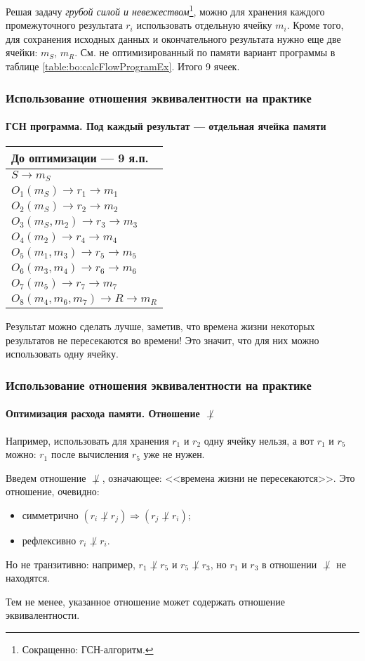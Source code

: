 Решая задачу \emph{грубой силой и невежеством}\footnote{Сокращенно: ГСН-алгоритм.}, можно для хранения каждого промежуточного результата $r_i$ использовать отдельную ячейку $m_i$. Кроме того, для сохранения исходных данных и окончательного результата нужно еще две ячейки: $m_S$, $m_R$. См. не оптимизированный по памяти вариант программы в таблице \ref{table:bo:calcFlowProgramEx}. Итого 9 ячеек.

\begin{frame}
    \frametitle{Использование отношения эквивалентности на практике}
    \framesubtitle{ГСН программа. Под каждый результат --- отдельная ячейка памяти}
    
    \begin{center}
        \begin{tabular}{l}
            \hline\hline
            До оптимизации --- 9 я.п.      \\
            \hline\hline
            $S \to m_S$                    \\ \hline
            $O_1(m_S)\to r_1 \to m_1$      \\
            $O_2(m_S)\to r_2 \to m_2$      \\ \hline
            $O_3(m_S,m_2)\to r_3 \to m_3$  \\
            $O_4(m_2)\to r_4 \to m_4$      \\ \hline
            $O_5(m_1,m_3)\to r_5 \to m_5$  \\
            $O_6(m_3,m_4)\to r_6 \to m_6$  \\ \hline
            $O_7(m_5)\to r_7 \to m_7$      \\ \hline
            $O_8(m_4,m_6,m_7)\to R \to m_R$\\ \hline
        \end{tabular}    
    \end{center}
\end{frame}

Результат можно сделать лучше, заметив, что времена жизни некоторых результатов не пересекаются во времени! Это значит, что для них можно использовать одну ячейку. 

\begin{frame}
    \frametitle{Использование отношения эквивалентности на практике}
    \framesubtitle{Оптимизация расхода памяти. Отношение $\not\perp$}
    
    Например, использовать для хранения $r_1$ и $r_2$ одну ячейку нельзя, а вот $r_1$ и $r_5$ можно: $r_1$ после вычисления $r_5$ уже не нужен. 
    
    Введем отношение $\not\perp$, означающее: <<времена жизни не пересекаются>>. Это отношение, очевидно:
    \begin{itemize}
        \item симметрично $(r_i\not\perp r_j)\Rightarrow (r_j\not\perp r_i)$; 
        \item рефлексивно $r_i\not\perp r_i$.
    \end{itemize}
    Но не транзитивно: например, $r_1\not\perp r_5$ и $r_5\not\perp r_3$, но $r_1$ и $r_3$ в отношении $\not\perp$ не находятся. 
    
    Тем не менее, указанное отношение может содержать отношение эквивалентности.
\end{frame}

